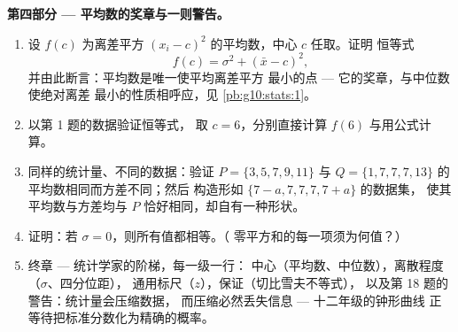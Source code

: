 \begin{problem}
\medskip
\noindent\textbf{第四部分 --- 平均数的奖章与一则警告。}
\begin{enumerate}[resume]
  \item 设 $f(c)$ 为离差平方
        $(x_i - c)^2$ 的平均数，中心 $c$ 任取。证明
        恒等式
        \[
        f(c) = \sigma^2 + (\bar x - c)^2 ,
        \]
        并由此断言：平均数是唯一使平均离差平方
        最小的点 --- 它的奖章，与中位数使绝对离差
        最小的性质相呼应，见
        \cref{pb:g10:stats:1}。
  \item 以第 1 题的数据验证恒等式，
        取 $c = 6$，分别直接计算 $f(6)$ 与用公式计算。
  \item 同样的统计量、不同的数据：验证
        $P = \{3, 5, 7, 9, 11\}$ 与 $Q = \{1, 7, 7, 7, 13\}$
        的平均数相同而方差不同；然后
        构造形如
        $\{7 - a, 7, 7, 7, 7 + a\}$ 的数据集，
        使其平均数与方差均与 $P$ 恰好相同，却自有一种形状。
  \item 证明：若 $\sigma = 0$，则所有值都相等。（
        零平方和的每一项须为何值？）
  \item 终章 --- 统计学家的阶梯，每一级一行：
        中心（平均数、中位数），离散程度（$\sigma$、四分位距），
        通用标尺（$z$），保证（切比雪夫不等式），
        以及第 18 题的警告：统计量会压缩数据，
        而压缩必然丢失信息 --- 十二年级的钟形曲线
        正等待把标准分数化为精确的概率。
\end{enumerate}
\end{problem}
